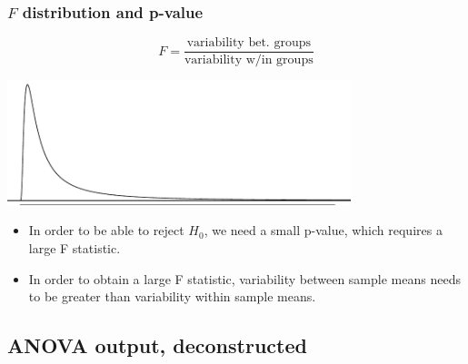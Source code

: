 \documentclass[notes,11pt, aspectratio=169]{beamer}
\begin{document}

%
%
%
%
%
%
%

\begin{frame}
\frametitle{$F$ distribution and p-value}

\[ F =  \frac{\text{variability bet. groups}}{\text{variability w/in groups}} \]

\vspace{-1cm}

\begin{center}
\includegraphics[width=0.75\textwidth]{graphs/fdist}
\end{center}

\begin{itemize}

\item In order to be able to reject $H_0$, we need a small p-value, which requires a large F statistic.

\item In order to obtain a large F statistic, variability between sample means needs to be greater than variability within sample means.

\end{itemize}

\end{frame}


\subsection{ANOVA output, deconstructed}
\end{document}
